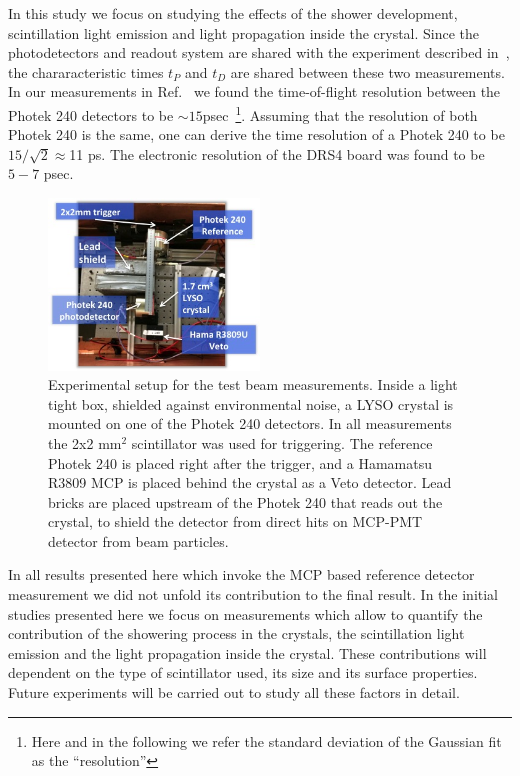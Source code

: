 \documentclass[11pt]{article}
\begin{document}
In this study we focus on studying the effects of the shower development,
scintillation light emission and light propagation inside the crystal. Since the
photodetectors and readout system are shared with the experiment described
in~\cite{MCPFastCaloNIMA}, the chararacteristic times $t_P$ and $t_D$ are shared
between these two measurements. In our measurements in
Ref.~\cite{MCPFastCaloNIMA} we found the time-of-flight resolution between the
Photek 240 detectors to be $\sim 15$psec~\footnote{Here and in the following we
refer the standard deviation of the Gaussian fit as the ``resolution''}.
Assuming that the resolution of both Photek 240 is the same, one can derive the
time resolution of a Photek 240 to be $15/\sqrt{2}\approx$11 ps. The electronic
resolution of the DRS4 board was found to be $5-7$ psec. 

\begin{figure}[h] \centering
\includegraphics[width=0.5\textwidth]{figs/SetupLYSO} 
\caption{Experimental
setup for the test beam measurements. Inside a light tight box, shielded against
environmental noise, a LYSO crystal is mounted on one of the Photek 240
detectors. In all measurements the 2x2 mm$^2$ scintillator was used for
triggering. The reference Photek 240 is placed right after the trigger, and a
Hamamatsu R3809 MCP is placed behind the crystal as a Veto detector. Lead bricks
are placed upstream of the Photek 240 that reads out the crystal, to shield the detector from 
direct hits on MCP-PMT detector from beam particles.} 
\label{fig:SetupLYSO}
\end{figure}


In all results presented here which invoke the MCP based reference detector
measurement we did not unfold its contribution to the final result. In the
initial studies presented here we focus on measurements which allow to quantify
the contribution of the showering process in the crystals, the scintillation
light emission and the light propagation inside the crystal. These contributions
will dependent on the type of scintillator used, its size and its surface
properties. Future experiments will be carried out to study all these factors in
detail.
\end{document}
